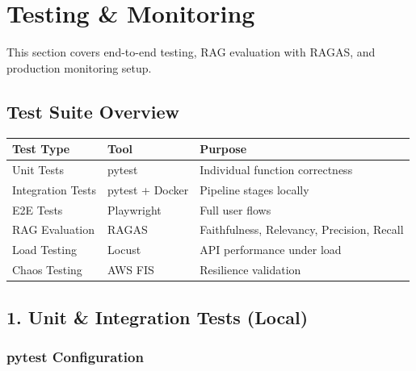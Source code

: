 \hypertarget{testing-monitoring}{%
\section{Testing \& Monitoring}}

This section covers end-to-end testing, RAG evaluation with RAGAS, and
production monitoring setup.

\hypertarget{test-suite-overview}{%
\subsection{Test Suite Overview}}

\begingroup
\small
\setlength{\tabcolsep}{3pt}
\renewcommand{\arraystretch}{1.15}
\begin{longtable}[]{@{}lll@{}}
\toprule\noalign{}
Test Type & Tool & Purpose \\
\midrule\noalign{}
\endhead
\bottomrule\noalign{}
\endlastfoot
Unit Tests & pytest & Individual function correctness \\
Integration Tests & pytest + Docker & Pipeline stages locally \\
E2E Tests & Playwright & Full user flows \\
RAG Evaluation & RAGAS & Faithfulness, Relevancy, Precision, Recall \\
Load Testing & Locust & API performance under load \\
Chaos Testing & AWS FIS & Resilience validation \\
\end{longtable}
\endgroup

\hypertarget{unit-integration-tests-local}{%
\subsection{1. Unit \& Integration Tests
(Local)}}

\hypertarget{pytest-configuration}{%
\subsubsection{pytest Configuration}}

\begin{Shaded}
\begin{Highlighting}[]
\KeywordTok{[pytest]}
\OtherTok{=}
\OtherTok{=}
\OtherTok{=}
\OtherTok{=}
\OtherTok{=}
\end{Highlighting}
\end{Shaded}

